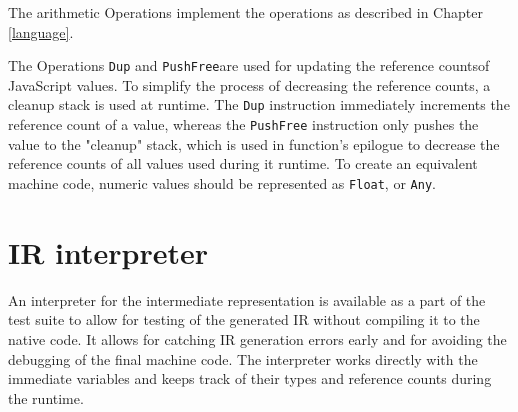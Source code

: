 The arithmetic Operations implement the operations as described in Chapter \ref{language}.

The Operations \texttt{Dup} and \texttt{PushFree}\footnotemark[1] are used for updating the reference counts\footnotemark[2] of JavaScript values. To simplify the process of decreasing the reference counts, a cleanup stack is used at runtime. The \texttt{Dup} instruction immediately increments the reference count of a value, whereas the \texttt{PushFree} instruction only pushes the value to the "cleanup" stack, which is used in function's epilogue to decrease the reference counts of all values used during it runtime. To create an equivalent machine code, numeric values should be represented as \texttt{Float}, or \texttt{Any}\footnotemark[3].





\section{IR interpreter}

An interpreter for the intermediate representation is available as a part of the test suite to allow for testing of the generated IR without compiling it to the native code. It allows for catching IR generation errors early and for avoiding the debugging of the final machine code. The interpreter works directly with the immediate variables and keeps track of their types and reference counts during the runtime.
